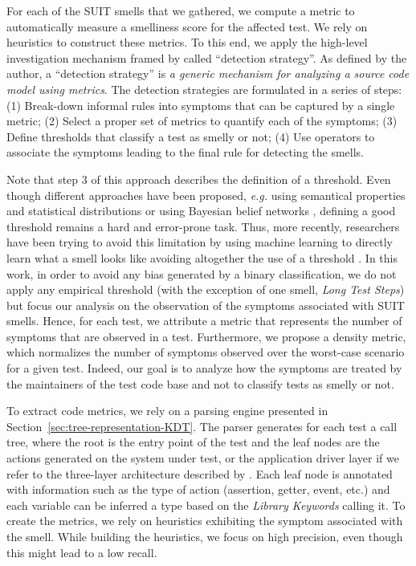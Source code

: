 For each of the SUIT smells that we gathered, we compute a metric to automatically measure a smelliness score for the affected test. We rely on heuristics to construct these metrics. To this end, we apply the high-level investigation mechanism framed by \textcite{Marinescu2004} called ``detection strategy''. As defined by the author, a ``detection strategy'' is \emph{a generic mechanism for analyzing a source code model using metrics}. The detection strategies are formulated in a series of steps: (1) Break-down informal rules into symptoms that can be captured by a single metric; (2) Select a proper set of metrics to quantify each of the symptoms; (3) Define thresholds that classify a test as smelly or not; (4) Use operators to associate the symptoms leading to the final rule for detecting the smells.

Note that step 3 of this approach describes the definition of a threshold. Even though different approaches have been proposed, \emph{e.g.} using semantical properties and statistical distributions \cite{Marinescu2004} or using Bayesian belief networks \cite{Khomh2009}, defining a good threshold remains a hard and error-prone task. Thus, more recently, researchers have been trying to avoid this limitation by using machine learning to directly learn what a smell looks like avoiding altogether the use of a threshold \cite{ArcelliFontana2016}. In this work, in order to avoid any bias generated by a binary classification, we do not apply any empirical threshold (with the exception of one smell, \emph{Long Test Steps}) but focus our analysis on the observation of the symptoms associated with SUIT smells. Hence, for each test, we attribute a metric that represents the number of symptoms that are observed in a test. Furthermore, we propose a density metric, which normalizes the number of symptoms observed over the worst-case scenario for a given test. Indeed, our goal is to analyze how the symptoms are treated by the maintainers of the test code base and not to classify tests as smelly or not.

To extract code metrics, we rely on a parsing engine presented in Section~\ref{sec:tree-representation-KDT}. The parser generates for each test a call tree, where the root is the entry point of the test and the leaf nodes are the actions generated on the system under test, or the application driver layer if we refer to the three-layer architecture described by \textcite{Humble2010}. Each leaf node is annotated with information such as the type of action (assertion, getter, event, etc.) and each variable can be inferred a type based on the \emph{Library Keywords} calling it. To create the metrics, we rely on heuristics exhibiting the symptom associated with the smell. While building the heuristics, we focus on high precision, even though this might lead to a low recall.

